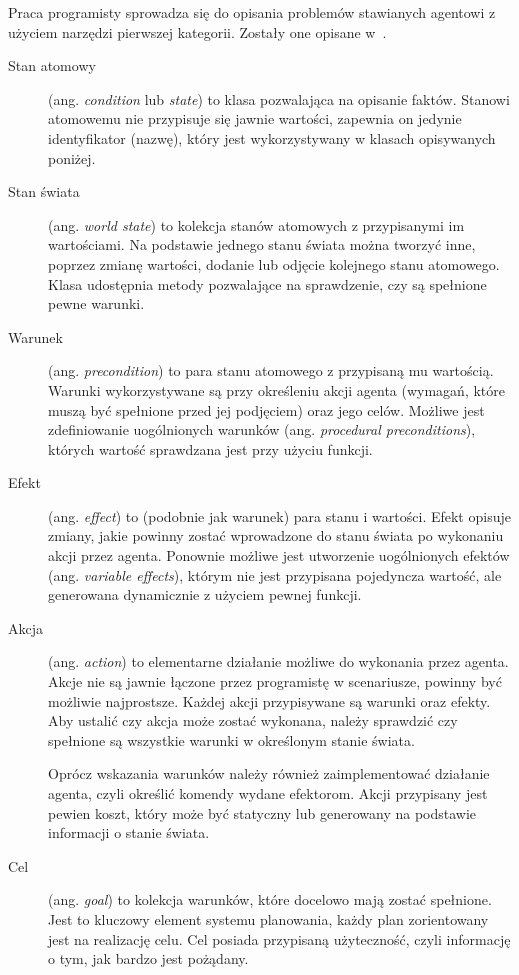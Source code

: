Praca programisty sprowadza się do opisania problemów stawianych agentowi z użyciem narzędzi pierwszej kategorii. Zostały one opisane w~\cite{ORKIarch, ORKIws, OWEN,  KOLB}.

\begin{description}
\item[Stan atomowy] {(ang. \textit{condition} lub \textit{state}) to klasa pozwalająca na opisanie faktów. Stanowi atomowemu nie przypisuje się jawnie wartości, zapewnia on jedynie identyfikator (nazwę), który jest wykorzystywany w klasach opisywanych poniżej.}
\item[Stan świata] {(ang. \textit{world state}) to kolekcja stanów atomowych z przypisanymi im wartościami. Na podstawie jednego stanu świata można tworzyć inne, poprzez zmianę wartości, dodanie lub odjęcie kolejnego stanu atomowego. Klasa udostępnia metody pozwalające na sprawdzenie, czy są spełnione pewne warunki.}
\item[Warunek] {(ang. \textit{precondition}) to para stanu atomowego z przypisaną mu wartością. Warunki wykorzystywane są przy określeniu akcji agenta (wymagań, które muszą być spełnione przed jej podjęciem) oraz jego celów. Możliwe jest zdefiniowanie uogólnionych warunków (ang. \textit{procedural preconditions}), których wartość sprawdzana jest przy użyciu funkcji.}
\item[Efekt] {(ang. \textit{effect}) to (podobnie jak warunek) para stanu i wartości. Efekt opisuje zmiany, jakie powinny zostać wprowadzone do stanu świata po wykonaniu akcji przez agenta. Ponownie możliwe jest utworzenie uogólnionych efektów (ang. \textit{variable effects}), którym nie jest przypisana pojedyncza wartość, ale generowana dynamicznie z użyciem pewnej funkcji.}
\item[Akcja] {(ang. \textit{action}) to elementarne działanie możliwe do wykonania przez agenta. Akcje nie są jawnie łączone przez programistę w scenariusze, powinny być możliwie najprostsze. Każdej akcji przypisywane są warunki oraz efekty. Aby ustalić czy akcja może zostać wykonana, należy sprawdzić czy spełnione są wszystkie warunki w określonym stanie świata. 

Oprócz wskazania warunków należy również zaimplementować działanie agenta, czyli określić komendy wydane efektorom. Akcji przypisany jest pewien koszt, który może być statyczny lub generowany na podstawie informacji o stanie świata. }
\item[Cel] {(ang. \textit{goal}) to kolekcja warunków, które docelowo mają zostać spełnione. Jest to kluczowy element systemu planowania, każdy plan zorientowany jest na realizację celu. Cel posiada przypisaną użyteczność, czyli informację o tym, jak bardzo jest pożądany.}
\end{description}

